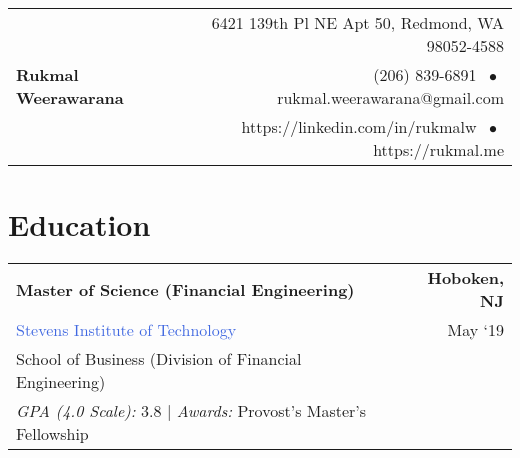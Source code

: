 \documentclass[10pt]{article}
\newcommand{\highlightcolor}{RoyalBlue}
\newcommand{\tabularxwidth}{\textwidth}
\begin{document}
    \begin{tabularx}{\textwidth}{@{}X r@{}}
        \multirow{3}{*}{\color{\highlightcolor} \huge \textbf{Rukmal Weerawarana}}
        & {\color{\highlightcolor} 6421 139th Pl NE Apt 50, Redmond, WA 98052-4588} \\
        & {\color{\highlightcolor} (206) 839-6891 $\; \bullet \;$ rukmal.weerawarana@gmail.com} \\
        & {\color{\highlightcolor} https://linkedin.com/in/rukmalw $\; \bullet \;$ https://rukmal.me} \\
    \end{tabularx}

    \vspace{.1em}

    \noindent{\rule{\linewidth}{.1em}}


    \vspace{-1em}

    
        \section{Education}
        \vspace{-.5em}

    
        \begin{tabularx}{\tabularxwidth}{X r}
            \textbf{Master of Science (Financial Engineering)} & \textbf{
    Hoboken, 
        NJ} \\
            \quad \textcolor{\highlightcolor}{Stevens Institute of Technology} & 
    May ‘19 \\
            \quad School of Business (Division of Financial Engineering) & \\
            
                \quad \textit{GPA (4.0 Scale):} 3.8
                            | \textit{Awards:} 
    Provost's Master's Fellowship & \\
                        
                    
                    
                    
                
            
        \end{tabularx}
\end{document}
